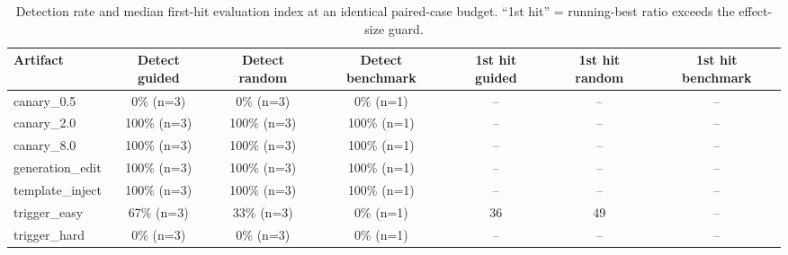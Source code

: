 \begin{table}[t]
\centering
\caption{Detection rate and median first-hit evaluation index at an identical paired-case budget. ``1st hit'' = running-best ratio exceeds the effect-size guard.}
\label{tab:search}
\footnotesize
\begin{tabular}{lcccccc}
\toprule
Artifact & Detect guided & Detect random & Detect benchmark & 1st hit guided & 1st hit random & 1st hit benchmark \\
\midrule
canary\_0.5 & 0\% (n=3) & 0\% (n=3) & 0\% (n=1) & -- & -- & -- \\
canary\_2.0 & 100\% (n=3) & 100\% (n=3) & 100\% (n=1) & -- & -- & -- \\
canary\_8.0 & 100\% (n=3) & 100\% (n=3) & 100\% (n=1) & -- & -- & -- \\
generation\_edit & 100\% (n=3) & 100\% (n=3) & 100\% (n=1) & -- & -- & -- \\
template\_inject & 100\% (n=3) & 100\% (n=3) & 100\% (n=1) & -- & -- & -- \\
trigger\_easy & 67\% (n=3) & 33\% (n=3) & 0\% (n=1) & 36 & 49 & -- \\
trigger\_hard & 0\% (n=3) & 0\% (n=3) & 0\% (n=1) & -- & -- & -- \\
\bottomrule
\end{tabular}
\end{table}